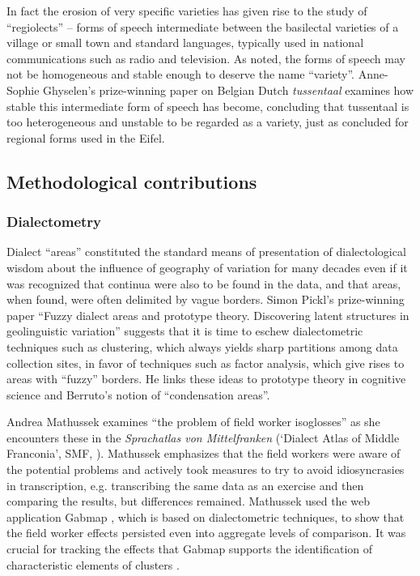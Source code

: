 \documentclass[output=paper]{LSP/langsci}
\begin{document}
In fact the erosion of very specific varieties has given rise to the study of “regiolects” \citep{auer_convergence_1996} – forms of speech intermediate between the basilectal varieties of a village or small town and standard languages, typically used in national communications such as radio and television. As \citet[22]{auer_europes_2005} noted, the forms of speech may not be homogeneous and stable enough to deserve the name “variety”.  Anne-Sophie Ghyselen’s prize-winning paper on Belgian Dutch \textit{tussentaal} examines how stable this intermediate form of speech has become, concluding that tussentaal is too heterogeneous and unstable to be regarded as a variety, just as \citet{lenz_struktur_2003} concluded for regional forms used in the Eifel.

\subsection{Methodological contributions}

\subsubsection{Dialectometry}
Dialect “areas” constituted the standard means of presentation of dialectological wisdom about the influence of geography of variation for many decades even if it was recognized that continua were also to be found in the data, and that areas, when found, were often delimited by vague borders. Simon Pickl’s prize-winning paper “Fuzzy dialect areas and prototype theory. Discovering latent structures in geolinguistic variation” suggests that it is time to eschew dialectometric techniques such as clustering, which always yields sharp partitions among data collection sites, in favor of techniques such as factor analysis, which give rises to areas with “fuzzy” borders.  He links these ideas to prototype theory in cognitive science and Berruto’s notion of “condensation areas”. 

Andrea Mathussek examines “the problem of field worker isoglosses” as she encounters these in the \textit{Sprachatlas von Mittelfranken} (‘Dialect Atlas of Middle Franconia’, SMF, \citealt{munske_handbuch_2013}). Mathussek emphasizes that the field workers were aware of the potential problems and actively took measures to try to avoid idiosyncrasies in transcription, e.g. transcribing the same data as an exercise and then comparing the results, but differences remained. Mathussek used the web application Gabmap \citep{nerbonne_gabmap_2011}, which is based on dialectometric techniques, to show that the field worker effects persisted even into aggregate levels of comparison. It was crucial for tracking the effects that Gabmap supports the identification of characteristic elements of clusters \citep{prokic_detecting_2012}. 
\end{document}
